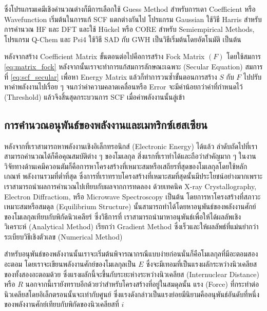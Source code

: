 ซึ่งโปรแกรมเคมีเชิงคำนวณต่างก็มีการเลือกใช้ Guess Method สำหรับการเดา Coefficient หรือ Wavefunction เริ่มต้นในการแก้ SCF แตกต่างกันไป
โปรแกรม Gaussian ใช้วิธี Harris สำหรับการคำนวณ HF และ DFT และใช้ H{\"u}ckel หรือ CORE สำหรับ Semiempirical Methods, 
โปรแกรม Q-Chem และ Psi4 ใช้วิธี SAD กับ GWH เป็นวิธีเริ่มต้นโดยอัตโนมัติ เป็นต้น

หลังจากสร้าง Coefficient Matrix ขั้นตอนต่อไปคือการสร้าง Fock Matrix $(F)$ โดยใช้สมการ \ref{eq:matrix_fock} 
หลังจากนั้นเราจะทำการแก้สมการลักษณะเฉพาะ (Secular Equation) สมการที่ \ref{eq:scf_secular} เพื่อหา Energy Matrix 
แล้วก็ทำการวนซ้ำขั้นตอนการสร้าง $S$ กับ $F$ ไปปรับหาค่าพลังงานไปเรื่อย ๆ จนกว่าค่าความคลาดเคลื่อนหรือ Error จะมีค่าน้อยกว่าค่าที่กำหนดไว้ 
(Threshold) แล้วจึงสิ้นสุดกระบวนการ SCF เมื่อค่าพลังงานนั้นลู่เข้า

\subsection{การคำนวณอนุพันธ์ของพลังงานและเมทริกซ์เฮสเซียน}
\label{ssec:ener_der}

หลังจากที่เราสามารถหาพลังงานเชิงอิเล็กทรอนิกส์ (Electronic Energy) ได้แล้ว ลำดับถัดไปที่เราสามารถคำนวณได้ก็คือคุณสมบัติต่าง ๆ ของโมเลกุล
สิ่งแรกที่เราทำได้และถือว่าสำคัญมาก ๆ ในงานวิจัยทางด้านเคมีควอนตัมก็คือการหาโครงสร้างที่เหมาะสมหรือเสถียรที่สุดของโมเลกุลโดยใช้หลักเกณฑ์%
พลังงานรวมที่ต่ำที่สุด ซึ่งการที่เราทราบโครงสร้างที่เหมาะสมที่สุดนั้นมีประโยชน์อย่างมากเพราะเราสามารถนำผลการคำนวณไปเทียบกับผลจากการทดลอง%
ด้วยเทคนิค X-ray Crystallography, Electron Diffractiom, หรือ Microwave Spectroscopy เป็นต้น โดยการหาโครงสร้างที่สภาวะ%
เหมาะสมหรือสมดุล (Equilibrium Structure) นั้นสามารถทำได้โดยหาอนุพันธ์ของพลังงานศักย์ของโมเลกุลเทียบกับพิกัดนิวเคลียร์ ซึ่งวิธีการที่%
เราสามารถนำมาหาอนุพันธ์เพื่อให้ได้ผลลัพเชิงวิเคราะห์ (Analytical Method) เรียกว่า Gradient Method ซึ่งเร็วและให้ผลลัพธ์ที่แม่นยำกว่า%
ระเบียบวิธีเชิงตัวเลข (Numerical Method)

สำหรับอนุพันธ์ของพลังงานนั้นเราจะเริ่มต้นพิจารณากรณีแบบง่ายก่อนนั่นก็คือโมเลกุลที่มีอะตอมสองอะตอม โดยเราจะเขียนพลังงานศักย์ของโมเลกุลเป็น 
$E$ ซึ่งจะมีเทอมที่เป็นแรงผลักระหว่างนิวเคลียสของทั้งสองอะตอมด้วย ซึ่งแรงผลักนี้จะขึ้นกับระยะห่างระหว่างนิวเคลียส (Internuclear Distance) 
หรือ $R$ นอกจากนี้เรายังทราบอีกด้วยว่าสำหรับโครงสร้างที่อยู่ในสมดุลนั้น แรง (Force) ที่กระทำต่อนิวเคลียสโดยอิเล็กตรอนนั้นจะเท่ากับศูนย์ 
ซึ่งแรงดังกล่าวเป็นแรงย่อยมีนิยามคืออนุพันธ์อันดับที่หนึ่งของพลังงานศักย์เทียบกับพิกัดของนิวเคลียสที่ $i$

